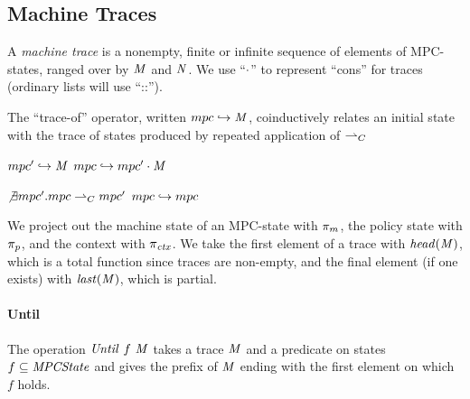 \documentclass[acmsmall,review,anonymous]{acmart}\settopmatter{printfolios=true,printccs=false,printacmref=false}
\begin{document}
\subsection{Machine Traces}
\label{sec:traces}

A {\em machine trace} is a nonempty, finite or infinite sequence of elements
of MPC-states, ranged over by \(\mathit{M}\) and \(\mathit{N}\).
We use ``\(\cdot\)'' to represent ``cons'' for traces (ordinary lists will use
``::'').

The ``trace-of'' operator, written \(mpc \hookrightarrow \mathit{M}\),
coinductively relates an initial state with the trace of states
produced by repeated application of \(\overset{}{\rightharpoonup}_C\)

\begin{center}
\begin{minipage}{.4\textwidth}
            {\(mpc' \hookrightarrow \mathit{M}\)}
            {\(mpc \hookrightarrow mpc' \cdot \mathit{M}\)}%
\end{minipage}
\begin{minipage}{.4\textwidth}
\judgment%
         {\(\not\exists mpc'. mpc \overset{}{\rightharpoonup}_C mpc'\)}
         {\(mpc \hookrightarrow mpc\)}
\end{minipage}
\end{center}
%

We project out the machine state of an MPC-state with \(\pi_m\), the
policy state with \(\pi_p\), and the context with \(\pi_{\mathit{ctx}}\).
We take the first element of a trace with \(\mathit{head}(\mathit{M})\), which is a total
function since traces are non-empty, and the final element (if one exists) with
\(\mathit{last}(\mathit{M})\), which is partial.

\paragraph*{Until}
The operation \(\mathit{Until} ~ f ~ \mathit{M}\) takes a trace \(\mathit{M}\)
and a predicate on states \(f \subseteq \mathit{MPCState}\) and gives the prefix of
\(\mathit{M}\) ending with the first element on which \(f\) holds.
\end{document}
